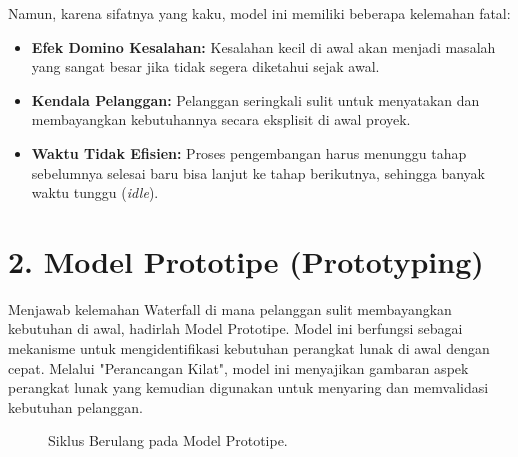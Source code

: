 \documentclass[12pt,a4paper]{article}
\begin{document}
Namun, karena sifatnya yang kaku, model ini memiliki beberapa kelemahan fatal:
\begin{itemize}
    \item \textbf{Efek Domino Kesalahan:} Kesalahan kecil di awal akan menjadi masalah yang sangat besar jika tidak segera diketahui sejak awal.
    \item \textbf{Kendala Pelanggan:} Pelanggan seringkali sulit untuk menyatakan dan membayangkan kebutuhannya secara eksplisit di awal proyek.
    \item \textbf{Waktu Tidak Efisien:} Proses pengembangan harus menunggu tahap sebelumnya selesai baru bisa lanjut ke tahap berikutnya, sehingga banyak waktu tunggu (\textit{idle}).
\end{itemize}

\newpage
\section{2. Model Prototipe (Prototyping)}

Menjawab kelemahan Waterfall di mana pelanggan sulit membayangkan kebutuhan di awal, hadirlah Model Prototipe. Model ini berfungsi sebagai mekanisme untuk mengidentifikasi kebutuhan perangkat lunak di awal dengan cepat. Melalui "Perancangan Kilat", model ini menyajikan gambaran aspek perangkat lunak yang kemudian digunakan untuk menyaring dan memvalidasi kebutuhan pelanggan.

\begin{figure}[h]
    \centering
    \caption{Siklus Berulang pada Model Prototipe.}
\end{figure}
\end{document}
